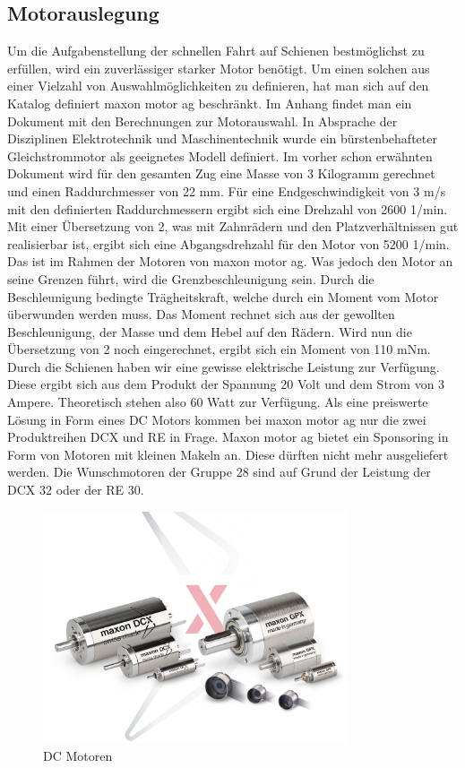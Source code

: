 \documentclass[../../main.tex]{subfiles}
\begin{document}
    \subsection{Motorauslegung}
          Um die Aufgabenstellung der schnellen Fahrt auf Schienen bestmöglichst zu erfüllen, wird ein zuverlässiger
          starker Motor benötigt. Um einen solchen aus einer Vielzahl von Auswahlmöglichkeiten zu definieren, hat man
          sich auf den Katalog definiert maxon motor ag beschränkt. Im Anhang findet man ein Dokument mit den
          Berechnungen zur Motorauswahl. In Absprache der Disziplinen Elektrotechnik und Maschinentechnik wurde ein
          bürstenbehafteter Gleichstrommotor als geeignetes Modell definiert. Im vorher schon erwähnten Dokument wird für
          den gesamten Zug eine Masse von 3 Kilogramm gerechnet und einen Raddurchmesser von 22 mm. Für eine
          Endgeschwindigkeit von 3 m/s mit den definierten Raddurchmessern ergibt sich eine Drehzahl von 2600 1/min. Mit
          einer Übersetzung von 2, was mit Zahnrädern und den Platzverhältnissen gut realisierbar ist, ergibt sich eine
          Abgangsdrehzahl für den Motor von 5200 1/min. Das ist im Rahmen der Motoren von maxon motor ag. Was jedoch den
          Motor an seine Grenzen führt, wird die Grenzbeschleunigung sein. Durch die Beschleunigung bedingte
          Trägheitskraft, welche durch ein Moment vom Motor überwunden werden muss. Das Moment rechnet sich aus der
          gewollten Beschleunigung, der Masse und dem Hebel auf den Rädern. Wird nun die Übersetzung von 2 noch
          eingerechnet, ergibt sich ein Moment von 110 mNm. Durch die Schienen haben wir eine gewisse elektrische
          Leistung zur Verfügung. Diese ergibt sich aus dem Produkt der Spannung 20 Volt und dem Strom von 3 Ampere.
          Theoretisch stehen also 60
          Watt zur Verfügung. Als eine preiswerte Lösung in Form eines DC Motors kommen bei
          maxon motor ag nur die zwei Produktreihen DCX und RE in Frage. Maxon motor ag bietet ein Sponsoring in Form
          von Motoren mit kleinen Makeln an. Diese dürften nicht mehr ausgeliefert werden. Die Wunschmotoren der Gruppe 28
          sind auf Grund der Leistung der DCX 32 oder der RE 30.

    \begin{figure}[H]
        \centering
        \includegraphics[width=0.8\textwidth]{../../images/Kran/Motors.JPG}
        \caption {DC Motoren}
    \end{figure}


    
\end{document}
